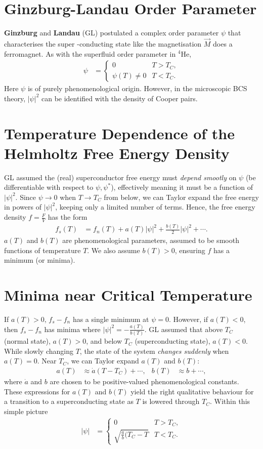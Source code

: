\documentclass[qo.tex]{subfiles}
\begin{document}
\section{Ginzburg-Landau Order Parameter}
\textbf{Ginzburg} and \textbf{Landau} (GL) postulated a complex order parameter $\psi$ that characterises the super -conducting state like the magnetisation $\vec{M}$ does a ferromagnet. 
As with the superfluid order parameter in ${}^4$He,
\begin{align}
    \psi &= \begin{cases} 0 & T>T_C, \\ \psi(T) \neq 0 & T<T_C.\end{cases}
\end{align}
Here $\psi$ is of purely phenomenological origin. 
However, in the microscopic BCS theory, $|\psi|^2$ can be identified with the density of Cooper pairs. 

\section{Temperature Dependence of the Helmholtz Free Energy Density}
GL assumed the (real) superconductor free energy must \emph{depend smootly} on $\psi$ (be differentiable with respect to $\psi,\psi^*$), effectively meaning it must be a function of $|\psi|^2$.
Since $\psi\to0$ when $T\to T_C$ from below, we can Taylor expand the free energy in powers of $|\psi|^2$, keeping only a limited number of terms. 
Hence, the free energy density $f=\frac{F}{V}$ has the form
\begin{align}
    f_s(T) &= f_n(T) + a(T)|\psi|^2 + \frac{b(T)}{2}|\psi|^2+\cdots.
\end{align}
$a(T)$ and $b(T)$ are phenomenological parameters, assumed to be smooth functions of temperature $T$. 
We also assume $b(T)>0$, ensuring $f$ has a minimum (or minima).

\section{Minima near Critical Temperature}
If $a(T)>0,\, f_s-f_n$ has a single minimum at $\psi=0$. 
However, if $a(T)<0$, then $f_s-f_n$ has minima where $|\psi|^2=-\frac{a(T)}{b(T)}$.
GL assumed that above $T_C$ (normal state), $a(T)>0$, and below $T_C$ (superconducting state), $a(T)<0$.
While slowly changing $T$, the state of the system \emph{changes suddenly} when $a(T)=0$.
Near $T_C$, we can Taylor expand $a(T)$ and $b(T)$:
\begin{align}
    a(T) &\approx \dot{a}(T-T_C) + \cdots, & b(T) &\approx b + \cdots,
\end{align}
where $\dot{a}$ and $b$ are chosen to be positive-valued phenomenological constants.
These expressions for $a(T)$ and $b(T)$ yield the right qualitative behaviour for a transition to a superconducting state as $T$ is lowered through $T_C$.
Within this simple picture
\begin{align}
    |\psi| &= \begin{cases} 0 & T>T_C, \\ \sqrt{\frac{\dot{a}}{b}(T_C-T} & T<T_C. \end{cases}
\end{align}
\end{document}
